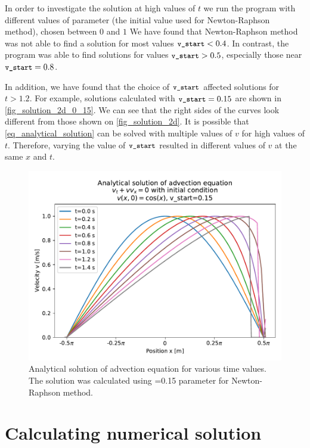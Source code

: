In order to investigate the solution at high values of $t$ we run the program with different values of  parameter (the initial value used for Newton-Raphson method), chosen between $0$ and $1$ We have found that Newton-Raphson method was not able to find a solution for most values $\texttt{\small v\_start} < 0.4$. In contrast, the program was able to find solutions for values $\texttt{\small v\_start} > 0.5$, especially those near $\texttt{\small v\_start} = 0.8$.

In addition, we have found that the choice of $\texttt{\small v\_start}$ affected solutions for $t > 1.2$. For example, solutions calculated with $\texttt{\small v\_start}=0.15$ are shown in \autoref{fig_solution_2d_0_15}. We can see that the right sides of the curves look different from those shown on \autoref{fig_solution_2d}. It is possible that \autoref{eq_analytical_solution} can be solved with multiple values of $v$ for high values of $t$. Therefore, varying the value of $\texttt{\small v\_start}$ resulted in different values of $v$ at the same $x$ and $t$.
\begin{figure}[H]
  \centering
  \includegraphics[width=1.0\textwidth]{figures/advection_analytical_solution_2d_vstart_0_15.pdf}
  \caption{Analytical solution of advection equation for various time values. The solution was calculated using =0.15 parameter for Newton-Raphson method.}
  \label{fig_solution_2d_0_15}
\end{figure}



\section{Calculating numerical solution}

